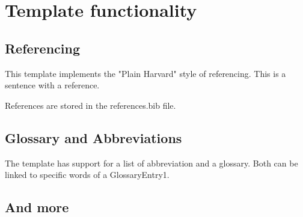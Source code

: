 \section{Template functionality}

\subsection{Referencing}

This template implements the "Plain Harvard" style of referencing. This is a sentence with a reference. \parencite{ExampleRef} 

References are stored in the references.bib file. 


\subsection{Glossary and Abbreviations}

The template has support for a list of \gls{abbreviation} and a glossary. Both can be linked to specific words of a \gls{GlossaryEntry1}.

\subsection{And more}

\blindtext